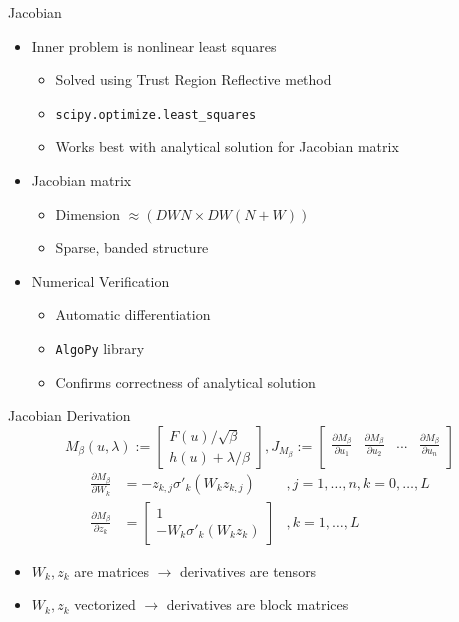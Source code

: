 \documentclass[11pt,t]{beamer}
\begin{document}
\begin{frame}[fragile]{Jacobian}
	\begin{itemize}
		\item Inner problem is nonlinear least squares
		\begin{itemize}
			\item Solved using Trust Region Reflective method
			\item \texttt{scipy.optimize.least\_squares}
			\item Works best with analytical solution for Jacobian matrix
		\end{itemize}
		\item Jacobian matrix
		\begin{itemize}
			\item Dimension $\approx (DWN \times DW(N+W))$
			\item Sparse, banded structure
		\end{itemize}
		\item Numerical Verification
		\begin{itemize}
			\item Automatic differentiation
			\item \texttt{AlgoPy} library
			\item Confirms correctness of analytical solution
		\end{itemize}
	\end{itemize}
\end{frame}

\begin{frame}[fragile]{Jacobian Derivation}
\begin{equation*}
M_{\beta}(u,\lambda) := \begin{bmatrix} F(u)/\sqrt{\beta} \\ h(u) + \lambda/\beta \end{bmatrix}, 
J_{M_{\beta}} := 
\begin{bmatrix}
\frac{\partial{M_{\beta}}}{\partial u_1} & 
\frac{\partial{M_{\beta}}}{\partial u_2} & ... & 
\frac{\partial{M_{\beta}}}{\partial u_n} \\
\end{bmatrix}
\end{equation*}
\begin{equation*}
	\begin{aligned}
	\frac{\partial{M_{\beta}}}{\partial W_k} &= -z_{k,j}\sigma'_k(W_kz_{k,j}) &, j = 1,\ldots,n, k = 0,\ldots,L \\
 	\frac{\partial{M_{\beta}}}{\partial z_k} &= \begin{bmatrix} 1 \\ -W_k\sigma'_k(W_kz_k) \end{bmatrix} &, k = 1,\ldots,L
 	\end{aligned}
 \end{equation*}
\begin{itemize}
	\item $W_k,z_k$ are matrices $\rightarrow$ derivatives are tensors
	\item $W_k,z_k$ vectorized $\rightarrow$ derivatives are block matrices
\end{itemize}
\end{frame}
\end{document}
